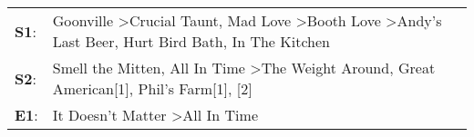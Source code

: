 \begin{supertabular}{p{0.03\textwidth}p{0.92\textwidth}}
 \textbf{S1}:  &  Goonville\textsuperscript{} \textgreater \enspace Crucial Taunt\textsuperscript{}, \enspace Mad Love\textsuperscript{} \textgreater \enspace Booth Love\textsuperscript{} \textgreater \enspace Andy's Last Beer\textsuperscript{}, \enspace Hurt Bird Bath\textsuperscript{}, \enspace In The Kitchen\textsuperscript{}  \enspace  \\
 \textbf{S2}:  &                                                         Smell the Mitten\textsuperscript{}, \enspace All In Time\textsuperscript{} \textgreater \enspace The Weight Around\textsuperscript{}, \enspace Great American[1]\textsuperscript{}, \enspace Phil's Farm[1]\textsuperscript{}, [2]\textsuperscript{}  \enspace  \\
 \textbf{E1}:  &                                                                                                                                                                                                                                   It Doesn't Matter\textsuperscript{} \textgreater \enspace All In Time\textsuperscript{}  \enspace  \\
\end{supertabular}
